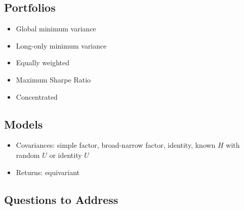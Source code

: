 \documentclass{article}
\begin{document}
\subsection{Portfolios}

\begin{itemize}
	\item Global minimum variance
	\item Long-only minimum variance
	\item Equally weighted
	\item Maximum Sharpe Ratio
	\item Concentrated
\end{itemize}

\subsection{Models}

\begin{itemize}
	\item Covariances: simple factor, broad-narrow factor, identity, known $H$ with random $U$ or identity $U$
	\item Returns: equivariant
\end{itemize}


\subsection{Questions to Address}
\end{document}
